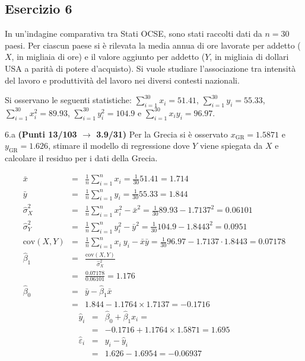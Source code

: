 \documentclass[
  11pt,
]{book}
\theoremstyle{mytheoremstyle}
\theoremstyle{mydefstyle}
\begin{document}
\subsection{Esercizio 6}\label{esercizio-6-36}

In un'indagine comparativa tra Stati OCSE, sono stati raccolti dati da \(n = 30\) paesi. Per ciascun paese si è rilevata la media annua di ore lavorate per addetto (\(X\), in migliaia di ore) e il valore aggiunto per addetto (\(Y\), in migliaia di dollari USA a parità di potere d'acquisto). Si vuole studiare l'associazione tra intensità del lavoro e produttività del lavoro nei diversi contesti nazionali.

Si osservano le seguenti statistiche:
\(\sum_{i=1}^{30}x_i=51.41\), \(\sum_{i=1}^{30}y_i=55.33\),
\(\sum_{i=1}^{30}x_i^2=89.93\), \(\sum_{i=1}^{30}y_i^2=104.9\) e \(\sum_{i=1}^{30}x_iy_i=96.97\).

6.a \textbf{(Punti 13/103 \(\rightarrow\) 3.9/31)} Per la Grecia si è osservato \(x_{\text{GR}}=1.5871\) e \(y_{\text{GR}}=1.626\), stimare il modello di regressione dove \(Y\) viene spiegata da \(X\) e calcolare il residuo per i dati della Grecia.

\begin{eqnarray*}
           \bar x &=&\frac 1 n\sum_{i=1}^n x_i = \frac {1}{ 30 }  51.41 =  1.714 \\
           \bar y &=&\frac 1 n\sum_{i=1}^n y_i = \frac {1}{ 30 }  55.33 =  1.844 \\
           \hat\sigma_X^2&=&\frac 1 n\sum_{i=1}^n x_i^2-\bar x^2=\frac {1}{ 30 }  89.93  - 1.7137 ^2= 0.06101 \\
           \hat\sigma_Y^2&=&\frac 1 n\sum_{i=1}^n y_i^2-\bar y^2=\frac {1}{ 30 }  104.9  - 1.8443 ^2= 0.0951 \\
           \text{cov}(X,Y)&=&\frac 1 n\sum_{i=1}^n x_i~y_i-\bar x\bar y=\frac {1}{ 30 }  96.97 - 1.7137 \cdot 1.8443 = 0.07178 \\
           \hat\beta_1 &=& \frac{\text{cov}(X,Y)}{\hat\sigma_X^2} \\
                    &=& \frac{ 0.07178 }{ 0.06101 }  =  1.176 \\
           \hat\beta_0 &=& \bar y - \hat\beta_1 \bar x\\
                    &=&  1.844 - 1.1764 \times  1.7137 = -0.1716 
         \end{eqnarray*}\begin{eqnarray*}
\hat y_i &=&\hat\beta_0+\hat\beta_1 x_i=\\ 
&=& -0.1716 + 1.1764 \times 1.5871 = 1.695 \\ 
\hat \varepsilon_i &=& y_i-\hat y_i\\ 
&=& 1.626 - 1.6954 = -0.06937  
\end{eqnarray*}
\end{document}
